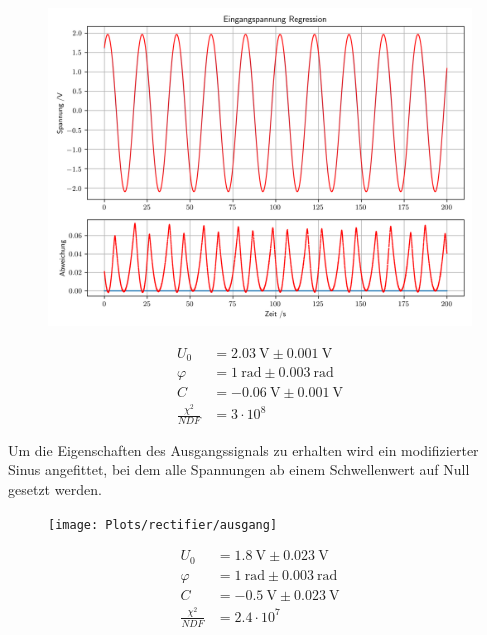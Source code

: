 \documentclass[12pt,twoside,a4paper]{scrartcl}
\begin{document}
			\begin{figure}[H]
				\begin{minipage}{0.69 \textwidth}
					\includegraphics[width =  \textwidth]{Plots/rectifier/eingang}
				\end{minipage}
				\begin{minipage}{0.29 \textwidth}
					\begin{align*}
						U_0 &= \SI{2.03}{\volt} \pm \SI{0.001}{ \volt} \\
						\varphi &= \SI{1}{\radian} \pm \SI{0.003}{\radian} \\
						C &= \SI{-0.06}{ \volt } \pm \SI{0.001}{\volt} \\
						\frac{\chi^2}{NDF} &= 3 \cdot 10^8
					\end{align*}
				\end{minipage}
			\end{figure}

			Um die Eigenschaften des Ausgangssignals zu erhalten wird ein modifizierter Sinus angefittet, bei dem alle Spannungen ab einem Schwellenwert auf Null gesetzt werden.

			\begin{figure}[H]
				\begin{minipage}{0.69 \textwidth}
					\texttt{[image: Plots/rectifier/ausgang]}
				\end{minipage}
				\begin{minipage}{0.29 \textwidth}
					\begin{align*}
						U_0 &= \SI{1.8}{\volt} \pm \SI{0.023}{\volt} \\
						\varphi &= \SI{1}{\radian} \pm \SI{0.003}{\radian} \\
						C &= \SI{-0.5}{ \volt } \pm \SI{0.023}{\volt} \\
						\frac{\chi^2}{NDF} &= 2.4 \cdot 10^7
					\end{align*}
				\end{minipage}
			\end{figure}
\end{document}
